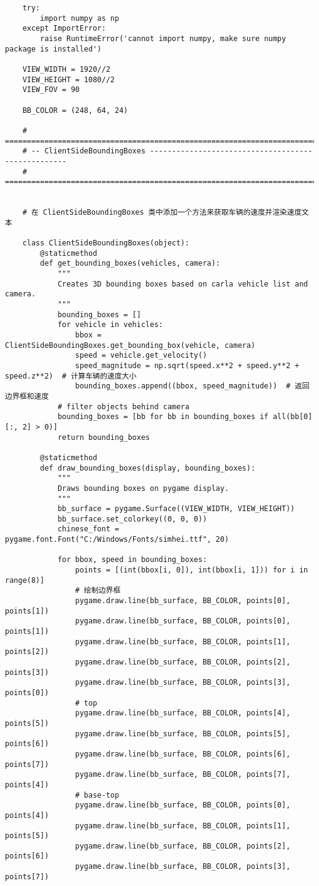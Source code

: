 \begin{lstlisting}
	try:
	    import numpy as np
	except ImportError:
	    raise RuntimeError('cannot import numpy, make sure numpy package is installed')
	
	VIEW_WIDTH = 1920//2
	VIEW_HEIGHT = 1080//2
	VIEW_FOV = 90
	
	BB_COLOR = (248, 64, 24)
	
	# ==============================================================================
	# -- ClientSideBoundingBoxes ---------------------------------------------------
	# ==============================================================================
	
	
	# 在 ClientSideBoundingBoxes 类中添加一个方法来获取车辆的速度并渲染速度文本
	
	class ClientSideBoundingBoxes(object):
	    @staticmethod
	    def get_bounding_boxes(vehicles, camera):
	        """
	        Creates 3D bounding boxes based on carla vehicle list and camera.
	        """
	        bounding_boxes = []
	        for vehicle in vehicles:
	            bbox = ClientSideBoundingBoxes.get_bounding_box(vehicle, camera)
	            speed = vehicle.get_velocity()
	            speed_magnitude = np.sqrt(speed.x**2 + speed.y**2 + speed.z**2)  # 计算车辆的速度大小
	            bounding_boxes.append((bbox, speed_magnitude))  # 返回边界框和速度
	        # filter objects behind camera
	        bounding_boxes = [bb for bb in bounding_boxes if all(bb[0][:, 2] > 0)]
	        return bounding_boxes
	
	    @staticmethod
	    def draw_bounding_boxes(display, bounding_boxes):
	        """
	        Draws bounding boxes on pygame display.
	        """
	        bb_surface = pygame.Surface((VIEW_WIDTH, VIEW_HEIGHT))
	        bb_surface.set_colorkey((0, 0, 0))
	        chinese_font = pygame.font.Font("C:/Windows/Fonts/simhei.ttf", 20)
	
	        for bbox, speed in bounding_boxes:
	            points = [(int(bbox[i, 0]), int(bbox[i, 1])) for i in range(8)]
	            # 绘制边界框
	            pygame.draw.line(bb_surface, BB_COLOR, points[0], points[1])
	            pygame.draw.line(bb_surface, BB_COLOR, points[0], points[1])
	            pygame.draw.line(bb_surface, BB_COLOR, points[1], points[2])
	            pygame.draw.line(bb_surface, BB_COLOR, points[2], points[3])
	            pygame.draw.line(bb_surface, BB_COLOR, points[3], points[0])
	            # top
	            pygame.draw.line(bb_surface, BB_COLOR, points[4], points[5])
	            pygame.draw.line(bb_surface, BB_COLOR, points[5], points[6])
	            pygame.draw.line(bb_surface, BB_COLOR, points[6], points[7])
	            pygame.draw.line(bb_surface, BB_COLOR, points[7], points[4])
	            # base-top
	            pygame.draw.line(bb_surface, BB_COLOR, points[0], points[4])
	            pygame.draw.line(bb_surface, BB_COLOR, points[1], points[5])
	            pygame.draw.line(bb_surface, BB_COLOR, points[2], points[6])
	            pygame.draw.line(bb_surface, BB_COLOR, points[3], points[7])
	            

\end{lstlisting}
